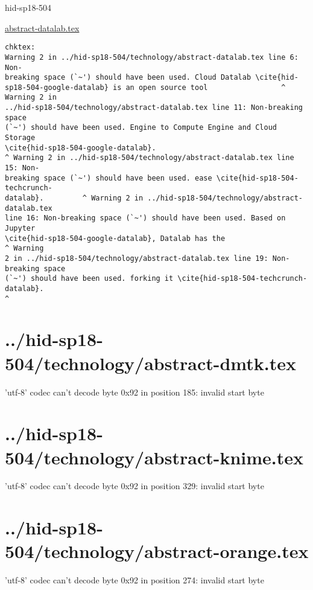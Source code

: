 \begin{IU}

hid-sp18-504

\href{https://github.com/cloudmesh-community/hid-sp18-504/blob/master//technology/abstract-datalab.tex}{abstract-datalab.tex}

\begin{tiny}
\begin{verbatim}
chktex:
Warning 2 in ../hid-sp18-504/technology/abstract-datalab.tex line 6: Non-
breaking space (`~') should have been used. Cloud Datalab \cite{hid-
sp18-504-google-datalab} is an open source tool                 ^ Warning 2 in
../hid-sp18-504/technology/abstract-datalab.tex line 11: Non-breaking space
(`~') should have been used. Engine to Compute Engine and Cloud Storage
\cite{hid-sp18-504-google-datalab}.
^ Warning 2 in ../hid-sp18-504/technology/abstract-datalab.tex line 15: Non-
breaking space (`~') should have been used. ease \cite{hid-sp18-504-techcrunch-
datalab}.         ^ Warning 2 in ../hid-sp18-504/technology/abstract-datalab.tex
line 16: Non-breaking space (`~') should have been used. Based on Jupyter
\cite{hid-sp18-504-google-datalab}, Datalab has the                    ^ Warning
2 in ../hid-sp18-504/technology/abstract-datalab.tex line 19: Non-breaking space
(`~') should have been used. forking it \cite{hid-sp18-504-techcrunch-datalab}.
^
\end{verbatim}
\end{tiny}
\end{IU}

\section{../hid-sp18-504/technology/abstract-dmtk.tex}
'utf-8' codec can't decode byte 0x92 in position 185: invalid start byte
\section{../hid-sp18-504/technology/abstract-knime.tex}
'utf-8' codec can't decode byte 0x92 in position 329: invalid start byte
\section{../hid-sp18-504/technology/abstract-orange.tex}
'utf-8' codec can't decode byte 0x92 in position 274: invalid start byte


